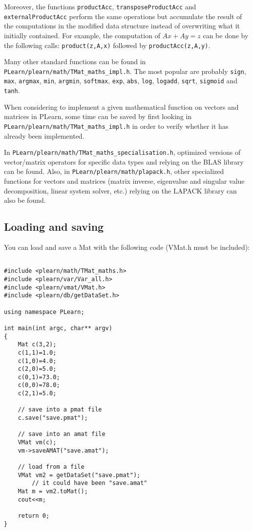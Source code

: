 \documentclass[11pt]{book}
\begin{document}
Moreover, the functions \texttt{productAcc}, \texttt{transposeProductAcc} and \texttt{externalProductAcc}
perform the same operations but accumulate the result of the computations in 
the modified data structure instead of overwriting what it initially contained.
For example, the computation of $A x + A y = z$ can be done by the following
calls: \texttt{product(z,A,x)} followed by \texttt{productAcc(z,A,y)}.

Many other standard functions can be found in \texttt{PLearn/plearn/math/TMat\_maths\_impl.h}. 
The most popular are probably \texttt{sign}, \texttt{max}, 
\texttt{argmax}, \texttt{min}, \texttt{argmin},
\texttt{softmax}, \texttt{exp}, \texttt{abs}, \texttt{log}, 
\texttt{logadd}, \texttt{sqrt}, \texttt{sigmoid} and \texttt{tanh}.

When considering to implement a given mathematical function on
vectors and matrices in PLearn, some time can be saved by first 
looking in \texttt{PLearn/plearn/math/TMat\_maths\_impl.h} 
in order to verify whether it has already been implemented.

In \texttt{PLearn/plearn/math/TMat\_maths\_specialisation.h}, optimized
versions of vector/matrix operators for specific data types and relying on the BLAS library
can be found.
Also, in \texttt{PLearn/plearn/math/plapack.h}, other specialized functions for vectors
and matrices (matrix inverse, eigenvalue and singular value decomposition, linear system
solver, etc.) relying on the LAPACK library can also be found.


\subsection{Loading and saving}
You can load and save a Mat with the following code (VMat.h
must be included):

\begin{verbatim}

#include <plearn/math/TMat_maths.h>
#include <plearn/var/Var_all.h>
#include <plearn/vmat/VMat.h>
#include <plearn/db/getDataSet.h>

using namespace PLearn;

int main(int argc, char** argv)
{
    Mat c(3,2);
    c(1,1)=1.0;
    c(1,0)=4.0;
    c(2,0)=5.0;
    c(0,1)=73.0;
    c(0,0)=78.0;
    c(2,1)=5.0;

    // save into a pmat file
    c.save("save.pmat");

    // save into an amat file
    VMat vm(c);
    vm->saveAMAT("save.amat");

    // load from a file
    VMat vm2 = getDataSet("save.pmat");
        // it could have been "save.amat"
    Mat m = vm2.toMat();
    cout<<m;

    return 0;
}

\end{verbatim}
\end{document}
